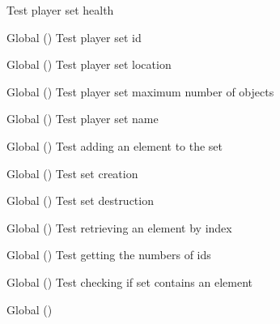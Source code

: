 \begin{DoxyRefList}
%
Test player set health  
\item[Global \doxylink{player__test_8c_a64fa15a235953bea694236b9d7841cbc}{test1\+\_\+player\+\_\+set\+\_\+id} ()]\label{test__test000118}%
%
Test player set id  
\item[Global \doxylink{player__test_8c_aec6799a4f46c3f3c471fcb668addcad4}{test1\+\_\+player\+\_\+set\+\_\+location} ()]\label{test__test000140}%
%
Test player set location  
\item[Global \doxylink{player__test_8c_a4bdfa1dd5911a0ed3bb1c8c040ede48d}{test1\+\_\+player\+\_\+set\+\_\+max\+\_\+objs} ()]\label{test__test000152}%
%
Test player set maximum number of objects  
\item[Global \doxylink{player__test_8c_a9d87c09e6af910d695265e3fd77ae3a2}{test1\+\_\+player\+\_\+set\+\_\+name} ()]\label{test__test000122}%
%
Test player set name  
\item[Global \doxylink{set__test_8c_a3f4cf88157b4c050501cf53ab17c6262}{test1\+\_\+set\+\_\+add\+\_\+id} ()]\label{test__test000158}%
%
Test adding an element to the set  
\item[Global \doxylink{set__test_8c_a6f654ab4b44e8a9b9cedfb78c378a5d7}{test1\+\_\+set\+\_\+create} ()]\label{test__test000154}%
%
Test set creation  
\item[Global \doxylink{set__test_8c_abbf27b57efa5c91184003ec07d1f5708}{test1\+\_\+set\+\_\+destroy} ()]\label{test__test000156}%
%
Test set destruction  
\item[Global \doxylink{set__test_8c_a40bf379ace49a3066fde90017e8d9d51}{test1\+\_\+set\+\_\+get\+\_\+id\+\_\+from\+\_\+index} ()]\label{test__test000166}%
%
Test retrieving an element by index  
\item[Global \doxylink{set__test_8c_a9a82ad51eca0f4cd5faf028e23b68bb3}{test1\+\_\+set\+\_\+get\+\_\+num\+\_\+ids} ()]\label{test__test000164}%
%
Test getting the numbers of ids  
\item[Global \doxylink{set__test_8c_affa806cab8e900cc297cc1a58f5ac35c}{test1\+\_\+set\+\_\+has\+\_\+id} ()]\label{test__test000162}%
%
Test checking if set contains an element  
\item[Global \doxylink{set__test_8c_a3c854f4944f73793ff85c2490401b6e8}{test1\+\_\+set\+\_\+print} ()]\label{test__test000168}%

\end{DoxyRefList}
